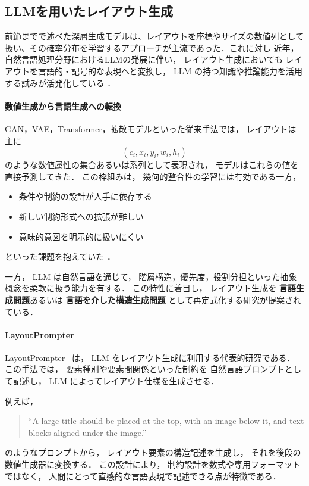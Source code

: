 \documentclass[a4j,12pt,dvipdfmx]{jsreport}
\begin{document}
\subsection{LLMを用いたレイアウト生成}
\label{sec:llm_layout_generation}
前節までで述べた深層生成モデルは、レイアウトを座標やサイズの数値列として扱い、その確率分布を学習するアプローチが主流であった．これに対し
近年，
自然言語処理分野におけるLLMの発展に伴い，
レイアウト生成においても
レイアウトを言語的・記号的な表現へと変換し，
LLM の持つ知識や推論能力を活用する試みが活発化している
\cite{lin_layoutprompter_2023,feng_layoutgpt_2023,tang2023layoutnuwa,seol_posterllama_2024,tanaka_scipostlayout_2024}．

\paragraph{数値生成から言語生成への転換}
GAN，VAE，Transformer，拡散モデルといった従来手法では，
レイアウトは主に
\[
   (c_i, x_i, y_i, w_i, h_i)
\]
のような数値属性の集合あるいは系列として表現され，
モデルはこれらの値を直接予測してきた．
この枠組みは，
幾何的整合性の学習には有効である一方，
\begin{itemize}
   \item 条件や制約の設計が人手に依存する
   \item 新しい制約形式への拡張が難しい
   \item 意味的意図を明示的に扱いにくい
\end{itemize}
といった課題を抱えていた
\cite{shi_understanding_2023,huang_survey_2023}．

一方，
LLM は自然言語を通じて，
階層構造，優先度，役割分担といった抽象概念を柔軟に扱う能力を有する．
この特性に着目し，
レイアウト生成を
\textbf{言語生成問題}あるいは
\textbf{言語を介した構造生成問題}
として再定式化する研究が提案されている．

\paragraph{LayoutPrompter}
LayoutPrompter~\cite{lin_layoutprompter_2023} は，
LLM をレイアウト生成に利用する代表的研究である．
この手法では，
要素種別や要素間関係といった制約を
自然言語プロンプトとして記述し，
LLM によってレイアウト仕様を生成させる．

例えば，
\begin{quote}
   ``A large title should be placed at the top, with an image below it, and text blocks aligned under the image.''
\end{quote}
のようなプロンプトから，
レイアウト要素の構造記述を生成し，
それを後段の数値生成器に変換する．
この設計により，
制約設計を数式や専用フォーマットではなく，
人間にとって直感的な言語表現で記述できる点が特徴である．
\end{document}
